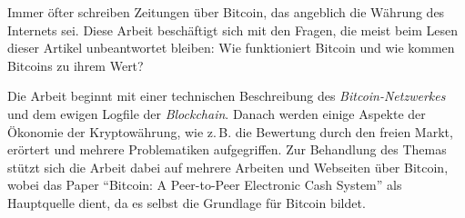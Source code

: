 Immer öfter schreiben Zeitungen über Bitcoin, das angeblich die Währung des Internets sei.
Diese Arbeit beschäftigt sich mit den Fragen, die meist beim Lesen dieser Artikel unbeantwortet bleiben:
Wie funktioniert Bitcoin und wie kommen Bitcoins zu ihrem Wert?

Die Arbeit beginnt mit einer technischen Beschreibung des \emph{Bitcoin-Netzwerkes} und dem ewigen Logfile der \emph{Blockchain}.
Danach werden einige Aspekte der Ökonomie der Kryptowährung, wie z.\,B. die Bewertung durch den freien Markt, erörtert und mehrere Problematiken aufgegriffen.
Zur Behandlung des Themas stützt sich die Arbeit dabei auf mehrere Arbeiten und Webseiten über Bitcoin, wobei das Paper "`Bitcoin: A Peer-to-Peer Electronic Cash System"' als Hauptquelle dient, da es selbst die Grundlage für Bitcoin bildet.
